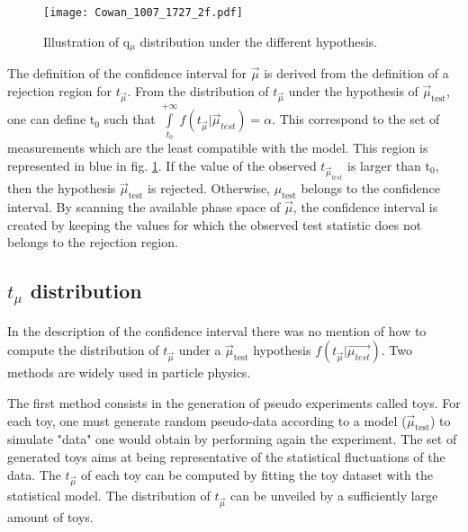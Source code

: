 \begin{figure}[htbp]
\centering
\texttt{[image: Cowan\_1007\_1727\_2f.pdf]}
\caption{\label{fig:org571b725}
Illustration of q\(_{\mu}\) distribution under the different hypothesis.\cite{Cowan:1071727}}
\end{figure}

The definition of the confidence interval for $\vec{\mu}$ is derived from the definition of a rejection region for $t_{\vec{\mu}}$.
From the distribution of $t_{\vec{\mu}}$ under the hypothesis of $\vec{\mu}_{\text{test}}$, one can define t\(_{\text{0}}\) such that \(\int\limits_{t_0}^{+\infty}f(t_{\vec{\mu}}|\vec{\mu}_{test})=\alpha\).
This correspond to the set of measurements which are the least compatible with the model.
This region is represented in blue in fig. \ref{fig:org571b725}.
If the value of the observed \(t_{\vec{\mu}_{test}}\) is larger than t\(_{\text{0}}\), then the hypothesis $\vec{\mu}_{\text{test}}$ is rejected.
Otherwise, \(\mu_{\text{test}}\) belongs to the confidence interval.
By scanning the available phase space of \(\vec{\mu}\), the confidence interval is created by keeping the values for which the observed test statistic does not belongs to the rejection region.


\subsection{$t_\mu$ distribution}
\label{sec:orgf0b767b}

In the description of the confidence interval there was no mention of how to compute the distribution of $t_{\vec{\mu}}$ under a $\vec{\mu}_{\text{test}}$ hypothesis \(f(t_{\vec{\mu}}|\vec{\mu_{test}})\).
Two methods are widely used in particle physics.

The first method consists in the generation of pseudo experiments called toys.
For each toy, one must generate random pseudo-data according to a model ($\vec{\mu}_{\text{test}}$) to simulate "data" one would obtain by performing again the experiment.
The set of generated toys aims at being representative of the statistical fluctuations of the data.
The $t_{\vec{\mu}}$ of each toy can be computed by fitting the toy dataset with the statistical model.
The distribution of $t_{\vec{\mu}}$ can be unveiled by a sufficiently large amount of toys.

